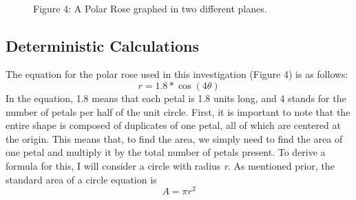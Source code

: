 \documentclass[11pt]{article}
\begin{document}
\begin{figure}[h]%
    \centering
    \qquad
    \\[3ex]%
    \footnotesize{Figure 4: A Polar Rose graphed in two different planes.}%
    \label{fig:example}%
\end{figure}

\subsection{Deterministic Calculations}
The equation for the polar rose used in this investigation (Figure 4) is as follows:\\[-3ex]
\[r=1.8*\cos(4\theta)\]
In the equation, 1.8 means that each petal is 1.8 units long, and 4 stands for the number of petals per half of the unit circle. First, it is important to note that the entire shape is composed of duplicates of one petal, all of which are centered at the origin. This means that, to find the area, we simply need to find the area of one petal and multiply it by the total number of petals present. To derive a formula for this, I will consider a circle with radius \emph{r}. As mentioned prior, the standard area of a circle equation is\\[-2ex]
\[A=\pi r^2\]
\end{document}
